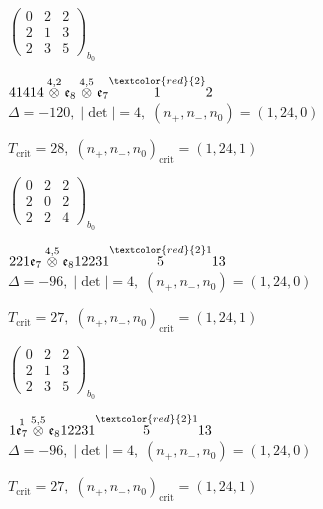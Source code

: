 \documentclass[10pt]{article}
\begin{document}
\hspace{2em}$\left(\begin{smallmatrix}0 & 2 & 2 \\ 2 & 1 & 3 \\ 2 & 3 & 5\end{smallmatrix}\right)_{\!b_0}$

\smallskip

$41414\overset{4,2}{\otimes}\mathfrak{e}_8\overset{4,5}{\otimes}\mathfrak{e}_7\overset{\textcolor{red}{2}}{1}2$ \quad $\Delta=-120,\; |\det|=4,\; (n_+,n_-,n_0)=(1,24,0)$

\hspace{1em}$T_{\text{crit}}=28,\; (n_+,n_-,n_0)_{\text{crit}}=(1,24,1)$

\hspace{2em}$\left(\begin{smallmatrix}0 & 2 & 2 \\ 2 & 0 & 2 \\ 2 & 2 & 4\end{smallmatrix}\right)_{\!b_0}$

\smallskip

$221\mathfrak{e}_7\overset{4,5}{\otimes}\mathfrak{e}_812231\overset{\textcolor{red}{2}1}{5}13$ \quad $\Delta=-96,\; |\det|=4,\; (n_+,n_-,n_0)=(1,24,0)$

\hspace{1em}$T_{\text{crit}}=27,\; (n_+,n_-,n_0)_{\text{crit}}=(1,24,1)$

\hspace{2em}$\left(\begin{smallmatrix}0 & 2 & 2 \\ 2 & 1 & 3 \\ 2 & 3 & 5\end{smallmatrix}\right)_{\!b_0}$

\smallskip

$1\overset{1}{\mathfrak{e}_7}\overset{5,5}{\otimes}\mathfrak{e}_812231\overset{\textcolor{red}{2}1}{5}13$ \quad $\Delta=-96,\; |\det|=4,\; (n_+,n_-,n_0)=(1,24,0)$

\hspace{1em}$T_{\text{crit}}=27,\; (n_+,n_-,n_0)_{\text{crit}}=(1,24,1)$
\end{document}
